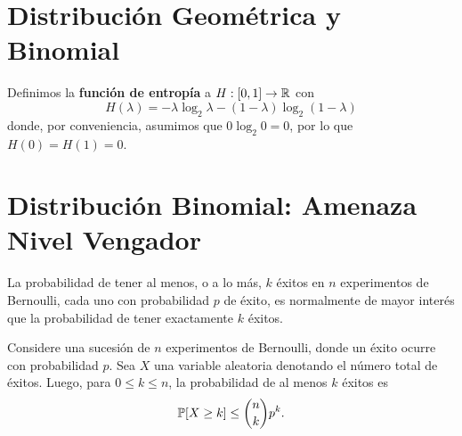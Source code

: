 







\section{Distribuci\'on Geom\'etrica y Binomial}











\begin{defn}
    Definimos la \textbf{funci\'on de entrop\'ia} a $H: [0, 1] \to \mathbb{R}$ con
    \[
        H(\lambda)     = -\lambda \log_2 \lambda - (1 - \lambda) \log_2 (1 - \lambda)
    \]
    donde, por conveniencia, asumimos que $0 \log_2 0 = 0$, por lo que $H(0) = H(1) = 0$.
\end{defn}







\section{Distribuci\'on Binomial: Amenaza Nivel Vengador}

La probabilidad de tener al menos, o a lo m\'as, $k$ \'exitos en $n$ experimentos de Bernoulli,
cada uno con probabilidad $p$ de \'exito, es normalmente de mayor inter\'es que la probabilidad
de tener exactamente $k$ \'exitos.

\begin{theorem}
    Considere una sucesi\'on de $n$ experimentos de Bernoulli, donde un \'exito ocurre con probabilidad $p$.
    Sea $X$ una variable aleatoria denotando el n\'umero total de \'exitos.
    Luego, para $0 \leq k \leq n$, la probabilidad de al menos $k$ \'exitos es
    \[
        \mathbb{P}[X \geq k] \leq \binom{n}{k} p^k.
    \]
\end{theorem}

